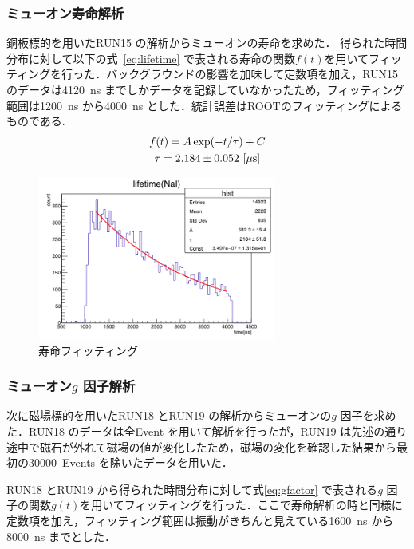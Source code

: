 
\subsubsection{ミューオン寿命解析}
銅板標的を用いたRUN15 の解析からミューオンの寿命を求めた．
得られた時間分布に対して以下の式~\eqref{eq:lifetime} で表される寿命の関数$f(t)$を用いてフィッティングを行った．バックグラウンドの影響を加味して定数項を加え，RUN15 のデータは4120~ns までしかデータを記録していなかったため，フィッティング範囲は1200~ns から4000~ns とした．統計誤差はROOTのフィッティングによるものである.
\begin{gather}
f(t) = A\exp(-t / \tau)+C \label{eq:lifetime}\\
\tau = 2.184 \pm 0.052~[\mu \mathrm{s}] \notag
\end{gather}
\begin{figure}[H]
\centering
\includegraphics[width  = 0.7\textwidth]{figure/mino/lifetime_NaI_ratio.png}
\caption{寿命フィッティング}
\end{figure}


\subsubsection{ミューオン$g$ 因子解析}

次に磁場標的を用いたRUN18 とRUN19 の解析からミューオンの$g$ 因子を求めた．RUN18 のデータは全Event を用いて解析を行ったが，RUN19 は先述の通り途中で磁石が外れて磁場の値が変化したため，磁場の変化を確認した結果から最初の30000~Events を除いたデータを用いた．

RUN18 とRUN19 から得られた時間分布に対して式\eqref{eq:gfactor} で表される$g$ 因子の関数$g(t)$を用いてフィッティングを行った．ここで寿命解析の時と同様に定数項を加え，フィッティング範囲は振動がきちんと見えている1600~ns から8000~ns までとした．

